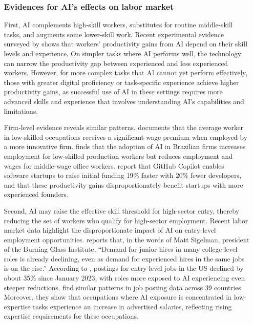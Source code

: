 \documentclass[12pt,english]{article}
\numberwithin{equation}{section}
\begin{document}
\subsubsection{Evidences for AI's effects on labor market}
First, AI complements high-skill workers, substitutes for routine middle-skill tasks, and augments some lower-skill work. Recent experimental evidence surveyed by \citet{calvino_effects_2025} shows that workers' productivity gains from AI depend on their skill levels and experience. On simpler tasks where AI performs well, the technology can narrow the productivity gap between experienced and less experienced workers. However, for more complex tasks that AI cannot yet perform effectively, those with greater digital proficiency or task-specific experience achieve higher productivity gains, as successful use of AI in these settings requires more advanced skills and experience that involves understanding AI's capabilities and limitations.

Firm-level evidence reveals similar patterns. \citet{aghion2019} documents that the average worker in low-skilled occupations receives a significant wage premium when employed by a more innovative firm. \citet{de_souza_artificial_2025} finds that the adoption of AI in Brazilian firms increases employment for low-skilled production workers but reduces employment and wages for middle-wage office workers. \citet{asam_generative_2025} report that GitHub Copilot enables software startups to raise initial funding 19\% faster with 20\% fewer developers, and that these productivity gains disproportionately benefit startups with more experienced founders.

\vspace{0.5cm}
\noindent
Second, AI may raise the effective skill threshold for high-sector 
entry, thereby reducing the set of workers who qualify for high-sector employment. Recent labor market data highlight the disproportionate impact of AI on entry-level employment opportunities. \citet{bloomberg2025} reports that, in the words of Matt Sigelman, president of the Burning Glass Institute, ``Demand for junior hires in many college-level roles is already declining, even as demand for experienced hires in the same jobs is on the rise.'' According to \citet{reveliolabs2025}, postings for entry-level jobs in the US declined by about 35\% since January 2023, with roles more exposed to AI experiencing even steeper reductions. \citet{klein_teeselink_ai_2026} find similar patterns in job posting data across 39 countries. Moreover, they show that occupations where AI exposure is concentrated in low-expertise tasks experience an increase in advertised salaries, reflecting rising expertise requirements for these occupations.
\end{document}
